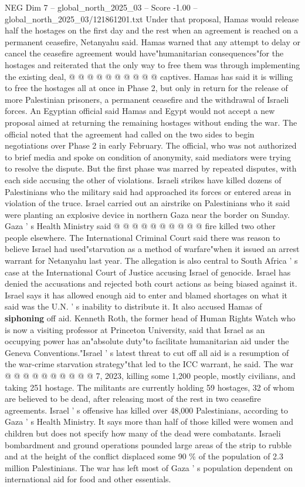 \begin{textsample}{NEG Dim 7 – global\_north\_2025\_03 – Score -1.00 – global\_north\_2025\_03/121861201.txt}
Under that proposal, Hamas would release half the hostages on the first day and the rest when an agreement is reached on a permanent ceasefire, Netanyahu said.
Hamas warned that any attempt to delay or cancel the ceasefire agreement would have"humanitarian consequences"for the hostages and reiterated that the only way to free them was through implementing the existing deal, @ @ @ @ @ @ @ @ @ @ captives.
Hamas has said it is willing to free the hostages all at once in Phase 2, but only in return for the release of more Palestinian prisoners, a permanent ceasefire and the withdrawal of Israeli forces.
An Egyptian official said Hamas and Egypt would not accept a new proposal aimed at returning the remaining hostages without ending the war.
The official noted that the agreement had called on the two sides to begin negotiations over Phase 2 in early February.
The official, who was not authorized to brief media and spoke on condition of anonymity, said mediators were trying to resolve the dispute.
But the first phase was marred by repeated disputes, with each side accusing the other of violations.
Israeli strikes have killed dozens of Palestinians who the military said had approached its forces or entered areas in violation of the truce.
Israel carried out an airstrike on Palestinians who it said were planting an explosive device in northern Gaza near the border on Sunday.
Gaza ' s Health Ministry said @ @ @ @ @ @ @ @ @ @ fire killed two other people elsewhere.
The International Criminal Court said there was reason to believe Israel had used"starvation as a method of warfare"when it issued an arrest warrant for Netanyahu last year.
The allegation is also central to South Africa ' s case at the International Court of Justice accusing Israel of genocide.
Israel has denied the accusations and rejected both court actions as being biased against it.
Israel says it has allowed enough aid to enter and blamed shortages on what it said was the U.N. ' s inability to distribute it.
It also accused Hamas of \textbf{siphoning} off aid.
Kenneth Roth, the former head of Human Rights Watch who is now a visiting professor at Princeton University, said that Israel as an occupying power has an"absolute duty"to facilitate humanitarian aid under the Geneva Conventions."Israel ' s latest threat to cut off all aid is a resumption of the war-crime starvation strategy"that led to the ICC warrant, he said.
The war @ @ @ @ @ @ @ @ @ @ 7, 2023, killing some 1,200 people, mostly civilians, and taking 251 hostage.
The militants are currently holding 59 hostages, 32 of whom are believed to be dead, after releasing most of the rest in two ceasefire agreements.
Israel ' s offensive has killed over 48,000 Palestinians, according to Gaza ' s Health Ministry.
It says more than half of those killed were women and children but does not specify how many of the dead were combatants.
Israeli bombardment and ground operations pounded large areas of the strip to rubble and at the height of the conflict displaced some 90 \% of the population of 2.3 million Palestinians.
The war has left most of Gaza ' s population dependent on international aid for food and other essentials.

\end{textsample}
